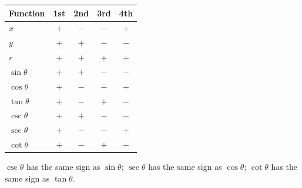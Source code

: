 \documentclass[12pt]{article}
\begin{document}
\noindent
\begin{minipage}[c]{0.50\textwidth}
\renewcommand{\arraystretch}{1.35}
\begin{tabular}{|l|c|c|c|c|}
\hline
\textbf{Function} & \textbf{1st} & \textbf{2nd} & \textbf{3rd} & \textbf{4th} \\
\hline
$x$            & $+$ & $-$ & $-$ & $+$ \\
$y$            & $+$ & $+$ & $-$ & $-$ \\
$r$            & $+$ & $+$ & $+$ & $+$ \\
\hline
$\sin\theta$   & $+$ & $+$ & $-$ & $-$ \\
$\cos\theta$   & $+$ & $-$ & $-$ & $+$ \\
$\tan\theta$   & $+$ & $-$ & $+$ & $-$ \\
\hline
$\csc\theta$   & $+$ & $+$ & $-$ & $-$ \\
$\sec\theta$   & $+$ & $-$ & $-$ & $+$ \\
$\cot\theta$   & $+$ & $-$ & $+$ & $-$ \\
\hline
\end{tabular}

\vspace{0.5em}
{\small
$\csc\theta$ has the same sign as $\sin\theta$;
$\sec\theta$ has the same sign as $\cos\theta$;
$\cot\theta$ has the same sign as $\tan\theta$.}
\end{minipage}%
\hfill
\end{document}
